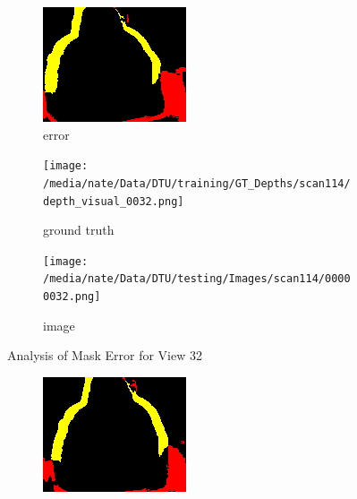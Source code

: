 \documentclass{article}
\begin{document}
\begin{figure}
\begin{subfigure}{0.3\textwidth}
		\includegraphics[width=\textwidth]{./output/032_error.png}
		\caption{error}
		\label{fig:error32}
	\end{subfigure}
	\hfill
	\centering
	\begin{subfigure}{0.3\textwidth}
		\centering
		\texttt{[image: /media/nate/Data/DTU/training/GT\_Depths/scan114/depth\_visual\_0032.png]}
		\caption{ground truth}
		\label{fig:gt32}
	\end{subfigure}
	\hfill
	\centering
	\begin{subfigure}{0.3\textwidth}
		\centering
		\texttt{[image: /media/nate/Data/DTU/testing/Images/scan114/00000032.png]}
		\caption{image}
		\label{fig:img32}
	\end{subfigure}
	\hfill
	\caption{Analysis of Mask Error for View 32}
	\label{fig:error_analys32}
\end{figure}\begin{figure}
	\centering
	\begin{subfigure}{0.3\textwidth}
		\centering
		\includegraphics[width=\textwidth]{./output/033_error.png}

\end{subfigure}
\end{figure}
\end{document}
